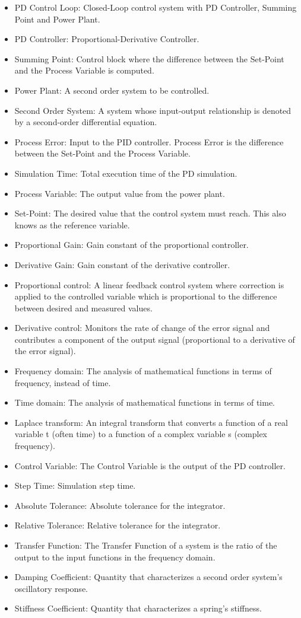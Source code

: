 \documentclass[12pt]{article}
\begin{document}
\begin{itemize}
\item{PD Control Loop: Closed-Loop control system with PD Controller, Summing Point and Power Plant.}
\item{PD Controller: Proportional-Derivative Controller.}
\item{Summing Point: Control block where the difference between the Set-Point and the Process Variable is computed.}
\item{Power Plant: A second order system to be controlled.}
\item{Second Order System: A system whose input-output relationship is denoted by a second-order differential equation.}
\item{Process Error: Input to the PID controller. Process Error is the difference between the Set-Point and the Process Variable.}
\item{Simulation Time: Total execution time of the PD simulation.}
\item{Process Variable: The output value from the power plant.}
\item{Set-Point: The desired value that the control system must reach. This also knows as the reference variable.}
\item{Proportional Gain: Gain constant of the proportional controller.}
\item{Derivative Gain: Gain constant of the derivative controller.}
\item{Proportional control: A linear feedback control system where correction is applied to the controlled variable which is proportional to the difference between desired and measured values.}
\item{Derivative control: Monitors the rate of change of the error signal and contributes a component of the output signal (proportional to a derivative of the error signal).}
\item{Frequency domain: The analysis of mathematical functions in terms of frequency, instead of time.}
\item{Time domain: The analysis of mathematical functions in terms of time.}
\item{Laplace transform: An integral transform that converts a function of a real variable t (often time) to a function of a complex variable s (complex frequency).}
\item{Control Variable: The Control Variable is the output of the PD controller.}
\item{Step Time: Simulation step time.}
\item{Absolute Tolerance: Absolute tolerance for the integrator.}
\item{Relative Tolerance: Relative tolerance for the integrator.}
\item{Transfer Function: The Transfer Function of a system is the ratio of the output to the input functions in the frequency domain.}
\item{Damping Coefficient: Quantity that characterizes a second order system's oscillatory response.}
\item{Stiffness Coefficient: Quantity that characterizes a spring's stiffness.}
\end{itemize}
\end{document}
